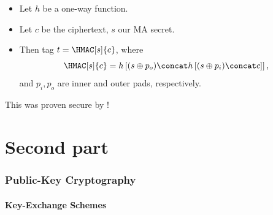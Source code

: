 \begin{frame}
  \begin{solution}
    \begin{itemize}
      \item Let \(h\) be a one-way function.
      \item Let \(c\) be the ciphertext, \(s\) our \ac{MA} secret.

        \pause{}

      \item Then tag \(t = \HMAC[s]{c}\), where \[
          \HMAC[s]{c} = h\left[
            (s\oplus p_o)\concat h\left[ (s\oplus p_i)\concat c \right]
          \right],
        \] and \(p_i, p_o\) are inner and outer pads, respectively.
    \end{itemize}
  \end{solution}

  \pause{}

  \begin{remark}
    This was proven secure by \textcite{HMAC}!
  \end{remark}
\end{frame}

\begin{frame}[allowframebreaks]
  \printbibliography
  \newrefsection
\end{frame}

\part{Second part}

\section{Public-Key Cryptography}

\subsection{Key-Exchange Schemes}


